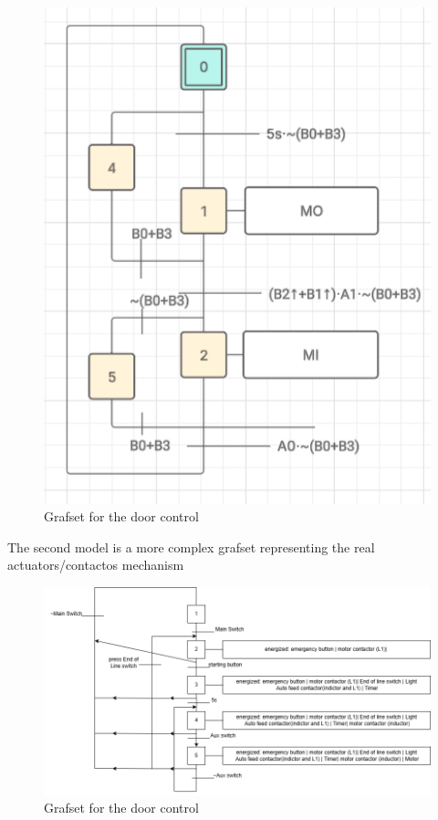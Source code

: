 \begin{figure}[H]
    \includegraphics[width=16cm]{Images/Q2/grafset_simple.png}
    \centering
    \caption{Grafset for the door control}
    \label{fig:grafset_simple}
\end{figure}

The second model is a more complex grafset representing the real actuators/contactos mechanism

\begin{figure}[H]
    \includegraphics[width=16cm]{Images/Q2/grafset_complex.png}
    \centering
    \caption{Grafset for the door control}
    \label{fig:grafset_complex}
\end{figure}

